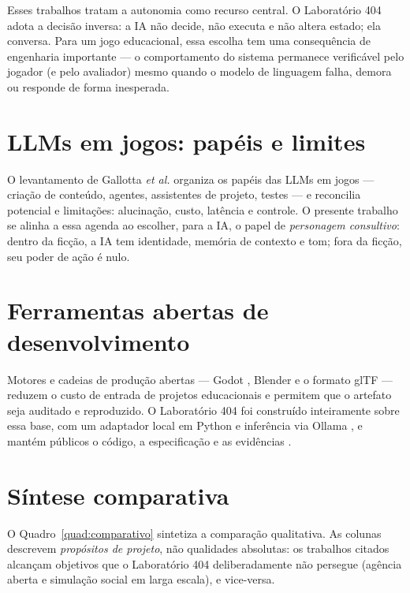 Esses trabalhos tratam a autonomia como recurso central. O Laboratório 404
adota a decisão inversa: a IA não decide, não executa e não altera estado; ela
conversa. Para um jogo educacional, essa escolha tem uma consequência de
engenharia importante --- o comportamento do sistema permanece verificável
pelo jogador (e pelo avaliador) mesmo quando o modelo de linguagem falha,
demora ou responde de forma inesperada.

\section{LLMs em jogos: papéis e limites}
\label{sec:rel_llms}

O levantamento de Gallotta \emph{et al.} \cite{gallotta2024largelanguage}
organiza os papéis das LLMs em jogos --- criação de conteúdo, agentes,
assistentes de projeto, testes --- e reconcilia potencial e limitações:
alucinação, custo, latência e controle. O presente trabalho se alinha a essa
agenda ao escolher, para a IA, o papel de \emph{personagem consultivo}: dentro
da ficção, a IA tem identidade, memória de contexto e tom; fora da ficção, seu
poder de ação é nulo.

\section{Ferramentas abertas de desenvolvimento}
\label{sec:rel_ferramentas}

Motores e cadeias de produção abertas --- Godot \cite{godot2026}, Blender
\cite{blender2026} e o formato glTF \cite{khronos2026gltf} --- reduzem o custo
de entrada de projetos educacionais e permitem que o artefato seja auditado e
reproduzido. O Laboratório 404 foi construído inteiramente sobre essa base,
com um adaptador local em Python \cite{fastapi2026,pydantic2026} e inferência
via Ollama \cite{ollama2026}, e mantém públicos o código, a especificação e as
evidências \cite{lab404repo,lab404video}.

\section{Síntese comparativa}
\label{sec:rel_sintese}

O Quadro~\ref{quad:comparativo} sintetiza a comparação qualitativa. As
colunas descrevem \emph{propósitos de projeto}, não qualidades absolutas: os
trabalhos citados alcançam objetivos que o Laboratório 404 deliberadamente não
persegue (agência aberta e simulação social em larga escala), e vice-versa.

